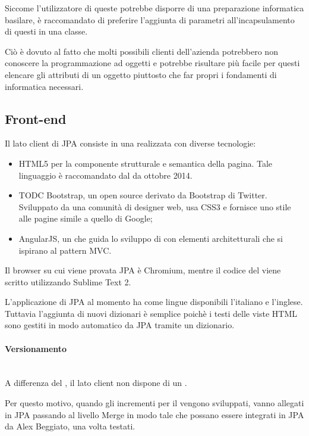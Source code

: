 Siccome l'utilizzatore di queste  potrebbe disporre di una
preparazione informatica basilare, è raccomandato di preferire l'aggiunta di
parametri all'incapsulamento di questi in una classe.

Ciò è dovuto al fatto che molti possibili clienti dell'azienda potrebbero
non conoscere la programmazione ad oggetti e potrebbe risultare più facile per
questi elencare gli attributi di un oggetto piuttosto che far propri i
fondamenti di informatica necessari.

\subsection{Front-end}

Il lato client di JPA consiste in una  realizzata con diverse
tecnologie:

\begin{itemize}
	\item HTML5 per la componente strutturale e semantica della pagina. Tale
	linguaggio è raccomandato dal  da ottobre 2014.
	\item TODC Bootstrap, un  open source derivato da Bootstrap
	di Twitter. Sviluppato da una comunità di designer web, usa CSS3 e fornisce
	uno stile alle pagine simile a quello di Google;
	\item AngularJS, un  che guida lo sviluppo di 
	con elementi architetturali che si ispirano al pattern MVC.
\end{itemize}

Il browser su cui viene provata JPA è Chromium, mentre il codice del \FREND{}
viene scritto utilizzando Sublime Text 2.

L'applicazione \FREND{} di JPA al momento ha come lingue disponibili l'italiano
e l'inglese. Tuttavia l'aggiunta di nuovi dizionari è semplice poichè i testi
delle viste HTML sono gestiti in modo automatico da JPA tramite un dizionario.

\paragraph{Versionamento} \mbox{} \\

A differenza del \BKEND{}, il lato client non dispone di un .

Per questo motivo, quando gli incrementi per il \FREND{} vengono sviluppati,
vanno allegati in JPA passando al livello Merge in modo tale che possano essere
integrati in JPA da Alex Beggiato, una volta testati.

